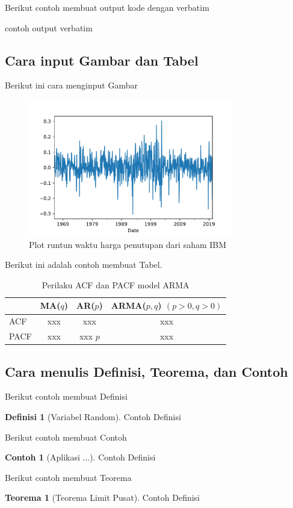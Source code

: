 \documentclass[a4paper,12pt]{article}
\theoremstyle{definition}
\newtheorem{definition}{Definisi}[section]
\newtheorem{theorem}{Teorema}[section]
\newtheorem{example}{Contoh}[section]
\begin{document}
Berikut contoh membuat output kode dengan verbatim 
\begin{spverbatim}
contoh output verbatim
    
\end{spverbatim}


\subsection{Cara input Gambar dan Tabel}
Berikut ini cara menginput Gambar
\begin{figure}[H]
    \centering
    \includegraphics[width=0.8\textwidth]{gb/Gam9-6-IBMDiff.pdf}
    \caption{Plot runtun waktu harga penutupan dari saham IBM}
    \label{Gam9-6-IBMDiff}
\end{figure}

Berikut ini adalah contoh membuat Tabel.
\begin{table}[H]
    \centering
    \begin{tabular}{lccc}
    \hline
    & MA($q$) & AR($p$) & ARMA($p,q$) $(p>0, q>0)$ \\
    \hline
    ACF & xxx & xxx  & xxx \\
    PACF  & xxx & xxx $p$ & xxx \\
    \hline
    \end{tabular}
    \caption{Perilaku ACF dan PACF model ARMA}
    \label{Tab-3.01-ACFPACF}
\end{table}


\subsection{Cara menulis Definisi, Teorema, dan Contoh}
Berikut contoh membuat Definisi
\begin{definition}[Variabel Random] %

Contoh Definisi
\end{definition}


Berikut contoh membuat Contoh
\begin{example}[Aplikasi ...]

Contoh Definisi
\end{example}


Berikut contoh membuat Teorema
\begin{theorem}[Teorema Limit Pusat] 

Contoh Definisi
\end{theorem}


\newpage
\printbibliography[heading=bibintoc,title={Daftar Pustaka}]
\end{document}
